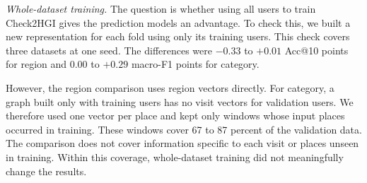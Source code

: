 \emph{Whole-dataset training.} The question is whether using all users to train
Check2HGI gives the prediction models an advantage. To check this, we built a new
representation for each fold using only its training users. This check covers three datasets at
one seed.
The differences were $-0.33$ to $+0.01$ Acc@10 points for region and $0.00$ to
$+0.29$ macro-F1 points for category.

However, the region comparison uses region vectors directly. For category, a graph built only
with training users has no visit vectors for validation users. We therefore used one
vector per place and kept only windows whose input places occurred in training. These
windows cover 67 to 87 percent of the validation data. The comparison does not cover
information specific to each visit or places unseen in training. Within this
coverage, whole-dataset training did not meaningfully change the results.

